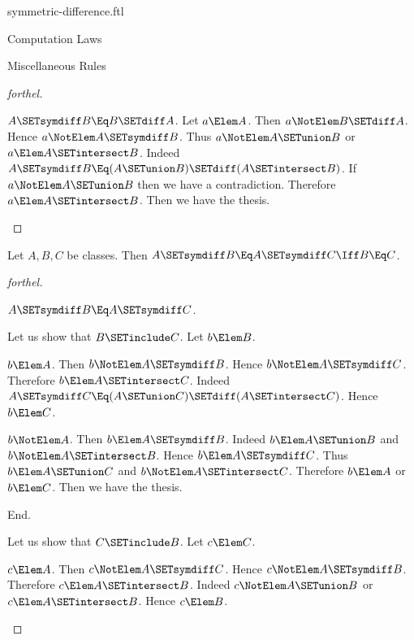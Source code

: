 \documentclass{stex}
\begin{document}
\begin{smodule}{symmetric-difference.ftl}
\begin{sfragment}{Computation Laws}
\begin{sfragment}{Miscellaneous Rules}
\begin{proof}[forthel]
      \begin{case}{$A \SETsymdiff B \Eq B \SETdiff A$.}
        Let $a \Elem A$.
        Then $a \NotElem B \SETdiff A$.
        Hence $a \NotElem A \SETsymdiff B$.
        Thus $a \NotElem A \SETunion B$ or $a \Elem A \SETintersect B$.
        Indeed $A \SETsymdiff B \Eq (A \SETunion B) \SETdiff (A \SETintersect B)$.
        If $a \NotElem A \SETunion B$ then we have a contradiction.
        Therefore $a \Elem A \SETintersect B$.
        Then we have the thesis.
      \end{case}
    \end{proof}

    \begin{proposition}[forthel]
      Let $A, B, C$ be classes.
      Then $A \SETsymdiff B \Eq A \SETsymdiff C \Iff B \Eq C$.
    \end{proposition}
    \begin{proof}[forthel]
      \begin{case}{$A \SETsymdiff B \Eq A \SETsymdiff C$.}

        Let us show that $B \SETinclude C$.
          Let $b \Elem B$.

          \begin{case}{$b \Elem A$.}
            Then $b \NotElem A \SETsymdiff B$.
            Hence $b \NotElem A \SETsymdiff C$.
            Therefore $b \Elem A \SETintersect C$.
            Indeed $A \SETsymdiff C \Eq (A \SETunion C) \SETdiff (A \SETintersect C)$.
            Hence $b \Elem C$.
          \end{case}

          \begin{case}{$b \NotElem A$.}
            Then $b \Elem A \SETsymdiff B$.
            Indeed $b \Elem A \SETunion B$ and $b \NotElem A \SETintersect B$.
            Hence $b \Elem A \SETsymdiff C$.
            Thus $b \Elem A \SETunion C$ and $b \NotElem A \SETintersect C$.
            Therefore $b \Elem A$ or $b \Elem C$.
            Then we have the thesis.
          \end{case}
        End.

        Let us show that $C \SETinclude B$.
          Let $c \Elem C$.

          \begin{case}{$c \Elem A$.}
            Then $c \NotElem A \SETsymdiff C$.
            Hence $c \NotElem A \SETsymdiff B$.
            Therefore $c \Elem A \SETintersect B$.
            Indeed $c \NotElem A \SETunion B$ or $c \Elem A \SETintersect B$.
            Hence $c \Elem B$.
          \end{case}


\end{case}
\end{proof}
\end{sfragment}
\end{sfragment}
\end{smodule}
\end{document}
